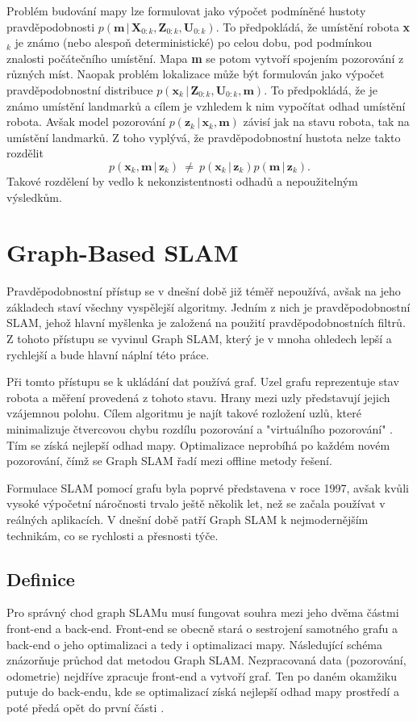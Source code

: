 \documentclass[12pt,a4paper]{report}
\begin{document}
Problém budování mapy lze formulovat jako výpočet podmíněné hustoty pravdě\-podobnosti $p(\textbf{m} \,|\, \textbf{X}_{0:k}, \textbf{Z}_{0:k}, \textbf{U}_{0:k})$. To předpokládá, že umístění robota \textbf{x}$_k$ je známo (nebo alespoň deterministické) po celou dobu, pod podmínkou znalosti počátečního umístění. Mapa \textbf{m} se potom vytvoří spojením pozorování z různých míst. Naopak problém lokalizace může být formulován jako výpočet pravděpodobnostní distribuce $p(\textbf{x}_k \,|\, \textbf{Z}_{0:k}, \textbf{U}_{0:k}, \textbf{m})$. To předpokládá, že je známo umístění landmarků a cílem je vzhledem k nim vypočítat odhad umístění robota. Avšak model pozorování $p(\textbf{z}_k \,|\, \textbf{x}_k, \textbf{m})$ závisí jak na stavu robota, tak na umístění landmarků. Z toho vyplývá, že pravděpodobnostní hustota nelze takto rozdělit
$$
p(\textbf{x}_k, \textbf{m} \,|\, \textbf{z}_k) \: \ne \: p(\textbf{x}_k \,|\, \textbf{z}_k)p(\textbf{m} \,|\, \textbf{z}_k).
$$
Takové rozdělení by vedlo k nekonzistentnosti odhadů a nepoužitelným výsledkům. 

\chapter{Graph-Based SLAM}
Pravděpodobnostní přístup se v dnešní době již téměř nepoužívá, avšak na jeho základech staví všechny vyspělejší algoritmy. Jedním z nich je pravděpodobnostní SLAM, jehož hlavní myšlenka je založená na použití pravděpodobnostních filtrů. Z tohoto přístupu se vyvinul Graph SLAM, který je v mnoha ohledech lepší a rychlejší a bude hlavní náplní této práce. 

Při tomto přístupu se k ukládání dat používá graf. Uzel grafu reprezentuje stav robota a měření provedená z tohoto stavu. Hrany mezi uzly představují jejich vzájemnou polohu. Cílem algoritmu je najít takové rozložení uzlů, které minimalizuje čtvercovou chybu rozdílu pozorování a "virtuálního pozorování" \cite{GraphSLAM}. Tím se získá nejlepší odhad mapy. Optimalizace neprobíhá po každém novém pozorování, čímž se Graph SLAM řadí mezi offline metody řešení.

Formulace SLAM pomocí grafu byla poprvé představena v roce 1997, avšak kvůli vysoké výpočetní náročnosti trvalo ještě několik let, než se začala používat v reálných aplikacích. V dnešní době patří Graph SLAM k nejmodernějším technikám, co se rychlosti a přesnosti týče.

\section{Definice}
Pro správný chod graph SLAMu musí fungovat souhra mezi jeho dvěma částmi front-end a back-end. Front-end se obecně stará o sestrojení samotného grafu a back-end o jeho optimalizaci a tedy i optimalizaci mapy. Následující schéma znázorňuje průchod dat metodou Graph SLAM. Nezpracovaná data (pozorování, odometrie) nejdříve zpracuje front-end a vytvoří graf. Ten po daném okamžiku putuje do back-endu, kde se optimalizací získá nejlepší odhad mapy prostředí a poté předá opět do první části \cite{16-graph-slam}.
\end{document}

